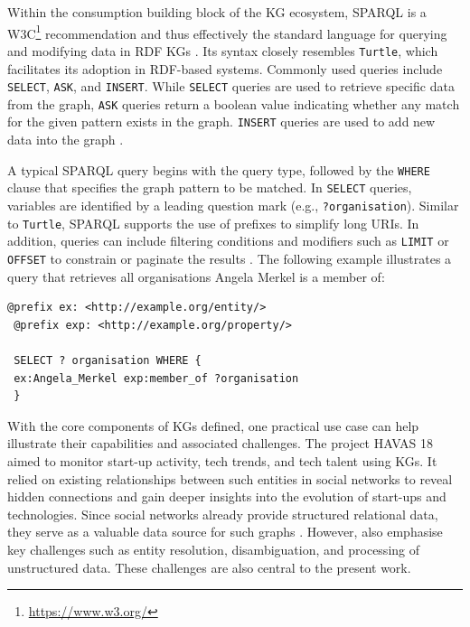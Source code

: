 \documentclass[a4paper,oneside,bibliography=totoc]{scrbook}
\begin{document}
Within the consumption building block of the \ac{KG} ecosystem, \ac{SPARQL} is a \ac{W3C}\footnote{\url{https://www.w3.org/}} recommendation and thus effectively the standard language for querying and modifying data in \ac{RDF} \acp{KG} \cite{Prudhommeaux2008}. Its syntax closely resembles \texttt{Turtle}, which facilitates its adoption in RDF-based systems. Commonly used queries include \texttt{SELECT}, \texttt{ASK}, and \texttt{INSERT}. While \texttt{SELECT} queries are used to retrieve specific data from the graph, \texttt{ASK} queries return a boolean value indicating whether any match for the given pattern exists in the graph. \texttt{INSERT} queries are used to add new data into the graph \cite{VillazonTerrazas2017}.

A typical \ac{SPARQL} query begins with the query type, followed by the \texttt{WHERE} clause that specifies the graph pattern to be matched. In \texttt{SELECT} queries, variables are identified by a leading question mark (e.g., \texttt{?organisation}). Similar to \texttt{Turtle}, \ac{SPARQL} supports the use of prefixes to simplify long \acp{URI}. In addition, queries can include filtering conditions and modifiers such as \texttt{LIMIT} or \texttt{OFFSET} to constrain or paginate the results \cite{VillazonTerrazas2017}. The following example illustrates a query that retrieves all organisations Angela Merkel is a member of:

\begin{lstlisting}[language=SPARQL, caption=Example of a \ac{SPARQL} Query, label=lst:turtle_example]
 @prefix ex: <http://example.org/entity/>
 @prefix exp: <http://example.org/property/>
  
 SELECT ? organisation WHERE {
 ex:Angela_Merkel exp:member_of ?organisation
 }
\end{lstlisting}

With the core components of \acp{KG} defined, one practical use case can help illustrate their capabilities and associated challenges. The project HAVAS 18 aimed to monitor start-up activity, tech trends, and tech talent using \acp{KG}. It relied on existing relationships between such entities in social networks to reveal hidden connections and gain deeper insights into the evolution of start-ups and technologies. Since social networks already provide structured relational data, they serve as a valuable data source for such graphs \cite{Monti2017}. However, \citet{Monti2017} also emphasise key challenges such as entity resolution, disambiguation, and processing of unstructured data. These challenges are also central to the present work.
\end{document}
